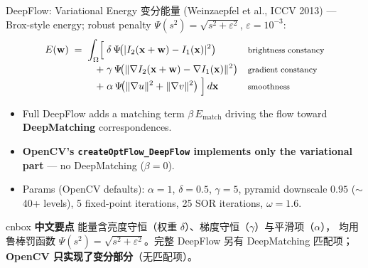 \documentclass[aspectratio=169,10pt]{beamer}
\newcommand{\zh}[1]{{\zhfont #1}}
\newenvironment{cn}{%
  \begin{beamercolorbox}[rounded=true,sep=4pt,wd=\textwidth]{cnbox}\zhfont\footnotesize
  {\color{cblue!70!black}\textbf{中文要点}}\quad}%
  {\end{beamercolorbox}}
\begin{document}
\begin{frame}{DeepFlow: Variational Energy \zh{变分能量}}
  {\small (Weinzaepfel et al., ICCV 2013) --- Brox-style energy; robust penalty
   $\Psi(s^2)=\sqrt{s^2+\varepsilon^2}$, $\varepsilon=10^{-3}$:}
  \begin{align*}
    E(\mathbf{w}) \;=\; \int_{\Omega} \Bigl[\;
        &\delta\, \Psi\!\bigl(|I_2(\mathbf{x}+\mathbf{w})-I_1(\mathbf{x})|^2\bigr)
        && \text{\footnotesize brightness constancy}\\[-2pt]
      +\;&\gamma\, \Psi\!\bigl(\|\nabla I_2(\mathbf{x}+\mathbf{w})-\nabla I_1(\mathbf{x})\|^2\bigr)
        && \text{\footnotesize gradient constancy}\\[-2pt]
      +\;&\alpha\, \Psi\!\bigl(\|\nabla u\|^2+\|\nabla v\|^2\bigr)
        \;\Bigr]\, d\mathbf{x}
        && \text{\footnotesize smoothness}
  \end{align*}
  \begin{itemize}
    \item Full DeepFlow adds a matching term
      $\beta\, E_{\mathrm{match}}$ driving the flow toward
      \textbf{DeepMatching} correspondences.
    \item \textbf{OpenCV's \texttt{createOptFlow\_DeepFlow} implements only the
      variational part} --- no DeepMatching ($\beta=0$).
    \item Params (OpenCV defaults): $\alpha=1$, $\delta=0.5$, $\gamma=5$,
      pyramid downscale $0.95$ ($\sim$40+ levels), 5 fixed-point iterations,
      25 SOR iterations, $\omega=1.6$.
  \end{itemize}
  \vfill
  \begin{cn}
    能量含亮度守恒（权重 $\delta$）、梯度守恒（$\gamma$）与平滑项（$\alpha$），
    均用鲁棒罚函数 $\Psi(s^2)=\sqrt{s^2+\varepsilon^2}$。完整 DeepFlow 另有
    DeepMatching 匹配项；\textbf{OpenCV 只实现了变分部分}（无匹配项）。
  \end{cn}
\end{frame}
\end{document}
